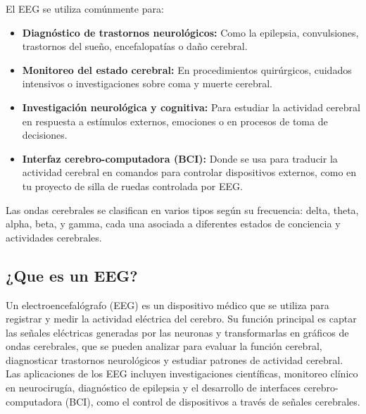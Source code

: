 \documentclass{article}
\begin{document}
El EEG se utiliza comúnmente para:
\begin{itemize}
    \item \textbf{Diagnóstico de trastornos neurológicos:} Como la epilepsia, convulsiones, trastornos del sueño, encefalopatías o daño cerebral.
    \item \textbf{Monitoreo del estado cerebral:} En procedimientos quirúrgicos, cuidados intensivos o investigaciones sobre coma y muerte cerebral.
    \item \textbf{Investigación neurológica y cognitiva:} Para estudiar la actividad cerebral en respuesta a estímulos externos, emociones o en procesos de toma de decisiones.
    \item \textbf{Interfaz cerebro-computadora (BCI):} Donde se usa para traducir la actividad cerebral en comandos para controlar dispositivos externos, como en tu proyecto de silla de ruedas controlada por EEG.
    
\end{itemize}

Las ondas cerebrales se clasifican en varios tipos según su frecuencia: delta, theta, alpha, beta, y gamma, cada una asociada a diferentes estados de conciencia y actividades cerebrales.

\subsection{¿Que es un EEG?}
Un electroencefalógrafo (EEG) es un dispositivo médico que se utiliza para registrar y medir la actividad eléctrica del cerebro. Su función principal es captar las señales eléctricas generadas por las neuronas y transformarlas en gráficos de ondas cerebrales, que se pueden analizar para evaluar la función cerebral, diagnosticar trastornos neurológicos y estudiar patrones de actividad cerebral. Las aplicaciones de los EEG incluyen investigaciones científicas, monitoreo clínico en neurocirugía, diagnóstico de epilepsia y el desarrollo de interfaces cerebro-computadora (BCI), como el control de dispositivos a través de señales cerebrales.
\end{document}
